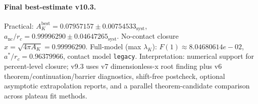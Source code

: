 \paragraph{Final best-estimate v10.3.}
Practical: $A_K^{\mathrm{best}} = 0.07957157 \pm 0.00754533_{\mathrm{syst}}$, $a_{\mathrm{nc}}/r_c = 0.99996290 \pm 0.04647265_{\mathrm{syst}}$.
No-contact closure $x = \sqrt{4\pi A_K} = 0.99996290$.
Full-model (max $\lambda_K$): $F(1) \approx 8.04680614e-02$, $a^*/r_c = 0.96379966$, contact model \texttt{legacy}.
Interpretation: numerical support for percent-level closure; v9.3 uses v7 dimensionless-x root finding plus v6 theorem/continuation/barrier diagnostics, shift-free postcheck, optional asymptotic extrapolation reports, and a parallel theorem-candidate comparison across plateau fit methods.
